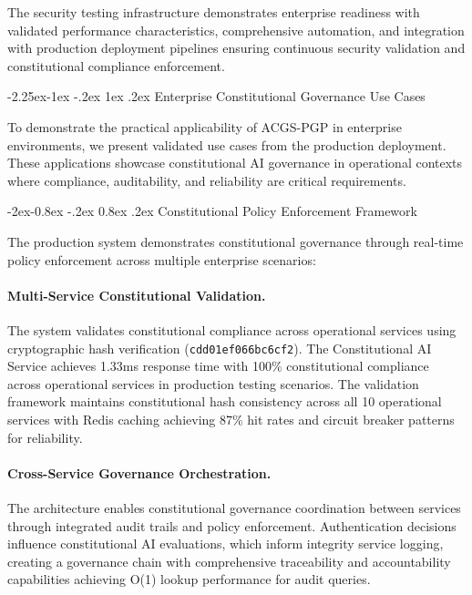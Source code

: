 \documentclass[manuscript,screen,9pt]{acmart}
\makeatletter
\renewcommand\subsection{\@startsection{subsection}{2}{\z@}%
  {-2.25ex\@plus -1ex \@minus -.2ex}%
  {1ex \@plus .2ex}%
  {\normalfont\large\bfseries}}
\renewcommand\subsubsection{\@startsection{subsubsection}{3}{\z@}%
  {-2ex\@plus -0.8ex \@minus -.2ex}%
  {0.8ex \@plus .2ex}%
  {\normalfont\normalsize\bfseries}}
\makeatother
\begin{document}
The security testing infrastructure demonstrates enterprise readiness with validated performance characteristics, comprehensive automation, and integration with production deployment pipelines ensuring continuous security validation and constitutional compliance enforcement.

\subsection{Enterprise Constitutional Governance Use Cases}
\label{subsec:enterprise_use_cases}

To demonstrate the practical applicability of ACGS-PGP in enterprise environments, we present validated use cases from the production deployment. These applications showcase constitutional AI governance in operational contexts where compliance, auditability, and reliability are critical requirements.

\subsubsection{Constitutional Policy Enforcement Framework}
\label{subsubsec:policy_enforcement_framework}

The production system demonstrates constitutional governance through real-time policy enforcement across multiple enterprise scenarios:

\paragraph{Multi-Service Constitutional Validation.} The system validates constitutional compliance across operational services using cryptographic hash verification (\texttt{cdd01ef066bc6cf2}). The Constitutional AI Service achieves 1.33ms response time with 100\% constitutional compliance across operational services in production testing scenarios. The validation framework maintains constitutional hash consistency across all 10 operational services with Redis caching achieving 87\% hit rates and circuit breaker patterns for reliability.

\paragraph{Cross-Service Governance Orchestration.} The architecture enables constitutional governance coordination between services through integrated audit trails and policy enforcement. Authentication decisions influence constitutional AI evaluations, which inform integrity service logging, creating a governance chain with comprehensive traceability and accountability capabilities achieving O(1) lookup performance for audit queries.
\end{document}
